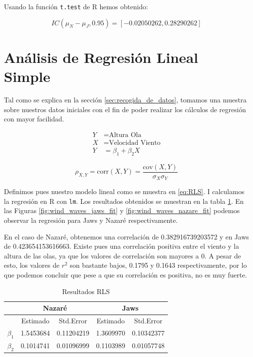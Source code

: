 Usando la función \texttt{t.test} de R hemos obtenido:

\[IC\left( \mu_N - \mu_J, 0.95\right) = \left[ -0.02050262, 0.28290262 \right]\]

\section{Análisis de Regresión Lineal Simple}
\label{sec:rls}

Tal como se explica en la sección \ref{sec:recogida_de_datos}, tomamos una muestra sobre nuestros datos
iniciales con el fin de poder realizar los cálculos de regresión con mayor facilidad. %

\begin{align}
\label{eq:RLS}
    Y &= \text{Altura Ola}     \nonumber \\
    X &= \text{Velocidad Viento}     \nonumber \\
    Y &= \beta_1 + \beta_2 X 
\end{align}

\begin{equation}
\label{eq:correlation}
    \rho_{X,Y}=\mathrm{corr}(X,Y) = \frac{\mathrm{cov}(X,Y)}{\sigma_X \sigma_Y}
\end{equation}

Definimos pues nuestro modelo lineal como se muestra en \ref{eq:RLS}. I calculamos la regresión en R con
\texttt{lm}. Los resultados obtenidos se muestran en la tabla \ref{tab:results_RLS}.
En las Figuras \ref{fig:wind_waves_jaws_fit} y \ref{fig:wind_waves_nazare_fit} podemos observar la
regresión para Jaws y Nazaré respectivamente.

En el caso de Nazaré, obtenemos una correlación de 0.382916739203572 y en Jaws de 0.423654153616663. Existe
pues una correlación positiva entre el viento y la altura de las olas, ya que los valores de
correlación son mayores a 0. A pesar de esto, los valores de \(r^2\) son bastante bajos, 0.1795 y 0.1643 respectivamente, por lo que podemos concluir que pese a que su correlación es positiva, no es muy fuerte.

\begin{table}[htbp]
    \centering
    \begin{tabular}{lcc|cc}
        \toprule
        & \multicolumn{2}{c}{Nazaré} & \multicolumn{2}{c}{Jaws} \\
        \midrule
        & Estimado & Std.Error & Estimado & Std.Error \\
        \midrule
        \(\beta_1\)     & 1.5453684 & 0.11204219  &  1.3609970 & 0.10342377  \\
        \(\beta_2\)     & 0.1014741 & 0.01096999  &  0.1103989 & 0.01057748 \\
        \bottomrule
    \end{tabular}
    \caption{Resultados RLS}
    \label{tab:results_RLS}
\end{table}

